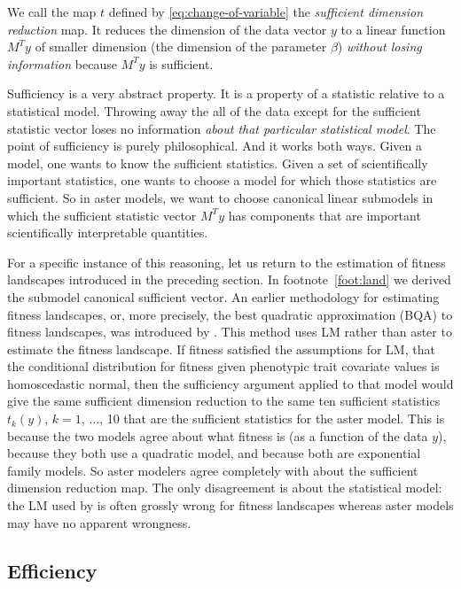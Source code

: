 \documentclass[11pt]{article}
\begin{document}
We call the map $t$ defined by \eqref{eq:change-of-variable} the
\emph{sufficient dimension reduction} map.  It reduces the dimension of the
data vector $y$ to a linear function $M^T y$ of smaller dimension
(the dimension of the parameter $\beta$) \emph{without losing information}
because $M^T y$ is sufficient.

Sufficiency is a very abstract property.  It is a property of a statistic
relative to a statistical model.  Throwing away the all of the data except
for the sufficient statistic vector loses no information \emph{about that
particular statistical model}.  The point of sufficiency is purely
philosophical.  And it works both ways.  Given a model, one wants to know
the sufficient statistics.  Given a set of scientifically important statistics,
one wants to choose a model for which those statistics are sufficient.  So
in aster models, we want to choose canonical linear submodels in which the
sufficient statistic vector $M^T y$ has components that are important
scientifically interpretable quantities.

For a specific instance of this reasoning, let us return to the estimation
of fitness landscapes introduced in the preceding section.
In footnote~\ref{foot:land} we derived the submodel canonical sufficient
vector.  An earlier methodology for estimating fitness landscapes, or, more
precisely, the best quadratic approximation (BQA) to fitness landscapes, was
introduced by \citet{la}.  This method uses LM rather than aster to estimate
the fitness landscape.  If fitness satisfied the assumptions for LM, that
the conditional distribution for fitness given phenotypic trait covariate
values is homoscedastic normal, then the sufficiency argument applied to that
model would give the same sufficient dimension reduction to the same ten
sufficient statistics $t_k(y)$, $k = 1$, $\ldots$, 10 that are the sufficient
statistics for the aster model.  This is because the two models agree about
what fitness is (as a function of the data $y$), because they both use
a quadratic model, and because both are exponential family models.
So aster modelers agree completely with \citet{la} about the sufficient
dimension reduction map.  The only disagreement is about the statistical model:
the LM used by \citet{la} is often grossly wrong for fitness landscapes
whereas aster models may have no apparent wrongness.

\subsection{Efficiency} \label{sec:efficiency}
\end{document}
